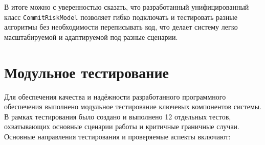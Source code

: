 В итоге можно с уверенностью сказать, что разработанный унифицированный класс \texttt{CommitRiskModel} позволяет гибко подключать и тестировать разные алгоритмы без необходимости переписывать код, что делает систему легко масштабируемой и адаптируемой под разные сценарии.

\section{Модульное тестирование}

Для обеспечения качества и надёжности разработанного программного обеспечения выполнено модульное тестирование ключевых компонентов системы. В рамках тестирования было создано и выполнено 12 отдельных тестов, охватывающих основные сценарии работы и критичные граничные случаи. Основные направления тестирования и проверяемые аспекты включают:

